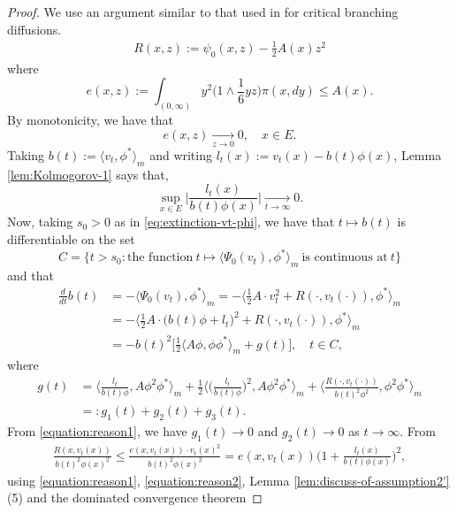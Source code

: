 \documentclass[UTF8]{pkuthss}
\theoremstyle{plain}
\theoremstyle{definition}
\numberwithin{equation}{section}
\begin{document}
\begin{proof}
	We use an argument similar to that used in \cite{Powell2016An-invariance} for critical branching diffusions.
\begin{align}
	R(x,z)
	:=\psi_0(x,z)-\frac{1}{2} A(x)z^2
\end{align}
	where
\[
	e(x,z)
	:=\int_{(0,\infty)}y^2\big(1\wedge \frac{1}{6}yz\big)\pi(x,dy)
	\leq  A(x).	
\]
	By monotonicity, we have that
\begin{equation}\label{equation:reason2}
	e(x,z)
	\xrightarrow[z\to 0]{} 0,
	\quad x\in E.
\end{equation}
	Taking $b(t):=\langle v_t,\phi^*\rangle_m$ and writing $l_t(x):=v_t(x)-b(t)\phi(x)$, Lemma \ref{lem:Kolmogorov-1} says that,
\begin{equation}\label{equation:reason1}
	\sup_{x\in E}\Big|\frac{l_t(x)}{b(t)\phi(x)}\Big|
	\xrightarrow[t\to\infty]{} 0.
\end{equation}
	Now, taking $s_0>0$ as in \eqref{eq:extinction-vt-phi},
	we have that $t\mapsto b(t)$ is differentiable on the set
\[
	C
	=\{t> s_0: \text{the function}~ t \mapsto \langle\Psi_0(v_t),\phi^*\rangle_m~ \text{is continuous at}~ t \}
\]
	and that
\begin{align}\label{equation:b(t)}
	\frac{d}{dt}b(t)
	&= -\langle\Psi_0(v_t),\phi^*\rangle_m
	= -\big\langle \frac{1}{2} A \cdot v_t^2+R (\cdot,v_t(\cdot)),\phi^*\big\rangle_m \\
	&= -\big\langle \frac{1}{2}  A \cdot \big(b(t)\phi+l_t\big)^2+R (\cdot,v_t(\cdot)),\phi^*\big\rangle_m\\
	&= -b(t)^2\big[\frac{1}{2} \langle  A\phi,\phi \phi^*\rangle_m+g(t)\big],
	\quad t\in C,
\end{align}	
	where
\begin{align}
	g(t)
	&= \Big\langle \frac{l_t}{b(t) \phi}, A\phi^2\phi^*\Big\rangle_m + \frac{1}{2}\Big\langle \Big(\frac{l_t}{b(t) \phi}\Big)^2, A\phi^2\phi^*\Big\rangle_m + \Big\langle \frac{R(\cdot,v_t(\cdot))}{b(t)^2 \phi^2},\phi^2\phi^*\Big\rangle_m \\
	&=: g_1(t) + g_2(t) + g_3(t).
\end{align}
	From \eqref{equation:reason1}, we have $g_1(t)\to 0$ and $g_2(t)\to 0$ as $t\to\infty$.
	From
\begin{align}
	\frac{R(x,v_t(x))}{b(t)^2 \phi(x)^2}
	\leq \frac{e(x,v_t(x))\cdot v_t(x)^2}{ b(t)^2\phi(x)^2}
	= e(x,v_t(x))\Big(1+\frac{l_t(x)}{ b(t) \phi(x)}\Big)^2,
\end{align}
	using \eqref{equation:reason1}, \eqref{equation:reason2}, Lemma \ref{lem:discuss-of-assumption2'} (5) and the dominated convergence theorem 

\end{proof}
\end{document}
